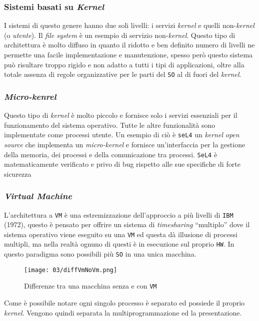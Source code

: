     \subsubsection{Sistemi basati su \textit{Kernel}}
        I sistemi di questo genere hanno due soli livelli: i servizi \textit{kernel} e quelli non-\textit{kernel} (o \textit{utente}). Il \textit{file system} è un esempio di servizio non-\textit{kernel}. Questo tipo di architettura è molto diffuso in quanto il ridotto e ben definito numero di livelli ne permette una facile implementazione e manutenzione, spesso però questo sistema può risultare troppo rigido e non adatto a tutti i tipi di applicazioni, oltre alla totale assenza di regole organizzative per le parti del \texttt{SO} al di fuori del \textit{kernel}.
    \subsubsection{\textit{Micro-kenrel}} 
        Questo tipo di \textit{kernel} è molto piccolo e fornisce solo i servizi essenziali per il funzionamento del sistema operativo. Tutte le altre funzionalità sono implementate come processi utente. Un esempio di ciò è \texttt{seL4} un \textit{kernel} \textit{open source} che implementa un \textit{micro-kernel} e fornisce un'interfaccia per la gestione della memoria, dei processi e della comunicazione tra processi. \texttt{SeL4} è matematicamente verificato e privo di bug rispetto alle sue specifiche di forte sicurezza 
    \subsubsection{\textit{Virtual Machine}}
        L'architettura a \texttt{VM} è una estremizzazione dell'approccio a più livelli di \texttt{IBM} (1972), questo è pensato per offrire un sistema di \textit{timesharing} ``multiplo'' dove il sistema operativo viene eseguito su una \texttt{VM} ed questa dà illusione di processi multipli, ma nella realtà ognuno di questi è in esecuzione sul proprio \texttt{HW}. In questo paradigma sono possibili più \texttt{SO} in una unica macchina. 
        \begin{figure}[H]
            \centering
            \texttt{[image: 03/diffVmNoVm.png]}
            \caption{Differenze tra una macchina senza e con \texttt{VM}}
        \end{figure}
        Come è possibile notare ogni singolo processo è separato ed possiede il proprio \textit{kernel}. Vengono quindi separata la multiprogrammazione ed la presentazione.
